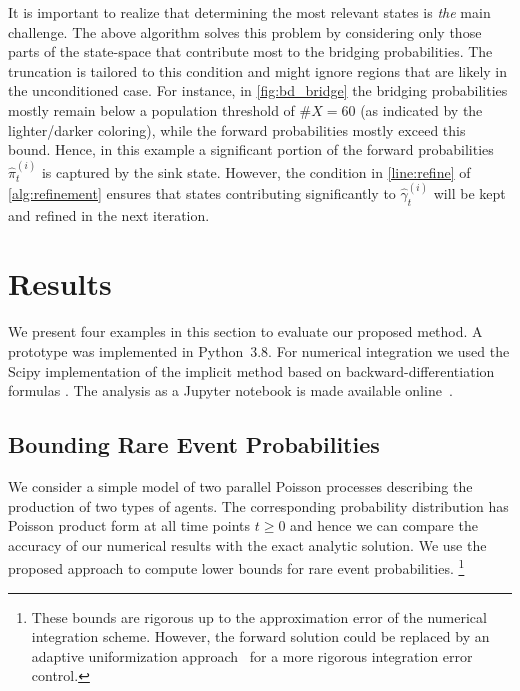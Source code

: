 It is important to realize that determining the most relevant states is \emph{the} main challenge.
The above algorithm solves this problem by considering only those parts of the state-space that contribute most to the bridging probabilities.
The truncation is tailored to this condition and might ignore regions that are likely in the unconditioned case.
For instance, in \autoref{fig:bd_bridge} the bridging probabilities mostly remain below a population threshold of $\#X=60$ (as indicated by the lighter/darker coloring), while the forward probabilities mostly exceed this bound. Hence, in this example a significant portion of the forward probabilities $\hat\pi_t^{(i)}$  
 is captured by the sink state. However, the condition in \autoref{line:refine} of \autoref{alg:refinement} ensures that
states contributing significantly to $\hat\gamma_t^{(i)}$ will be kept and refined in the next iteration.
 


\section{Results}\label{sec:bridging:results}
% 
We present four examples in this section to evaluate our proposed method. 
A prototype was implemented in Python~3.8. For numerical integration we used the Scipy implementation \cite{2020SciPy-NMeth} of the implicit method based on backward-differentiation formulas \cite{byrne1975polyalgorithm}.
The analysis as a Jupyter notebook is made available online~\cite{mjp_bridging}.

\subsection{Bounding Rare Event Probabilities}

We consider a simple model of two parallel Poisson processes describing the production of two 
types of agents. 
The corresponding probability distribution
has Poisson product form at all time points $t\geq 0$ and hence we can compare the accuracy of our  numerical results with the exact analytic solution.
We use the proposed approach to compute lower bounds for rare event probabilities.
\footnote{These bounds are rigorous up to the approximation error of the numerical integration scheme. However, the forward solution could be replaced by an adaptive uniformization approach~\cite{andreychenko2010fly} for a more rigorous integration error control.}



